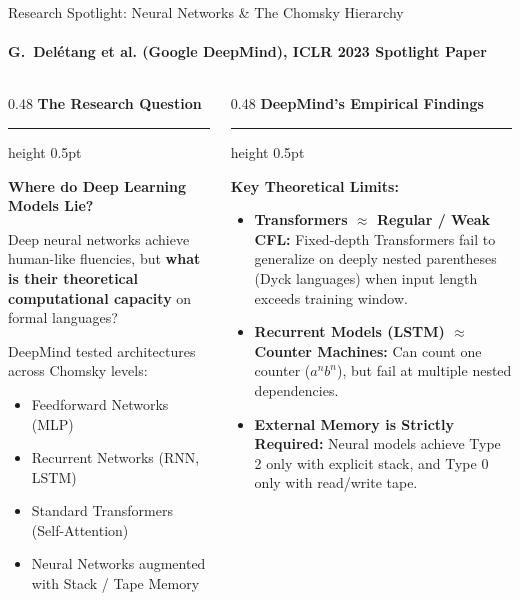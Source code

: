 \documentclass[aspectratio=169, 10pt]{beamer}
\newcommand{\colheader}[1]{%
  {\noindent\footnotesize\bfseries\color{gimpanavy}#1}%
  \vspace{0.02cm}%
  {\color{gimpanavy!30}\hrule height 0.5pt}%
  \vspace{0.05cm}%
}
\newcommand{\cardtitle}[1]{{\noindent\footnotesize\bfseries\color{gimpanavy}#1}\par\vspace{0.03cm}}
\newcommand{\alerttitle}[1]{{\noindent\footnotesize\bfseries\color{accentCrimson}#1}\par\vspace{0.03cm}}
\begin{document}
\begin{frame}{Research Spotlight: Neural Networks \& The Chomsky Hierarchy}
  \framesubtitle{G.~Delétang et al. (Google DeepMind), ICLR 2023 Spotlight Paper}
  
  \begin{columns}[T]
    \begin{column}{0.48\textwidth}
      \colheader{The Research Question}
      \begin{tcolorbox}[spotlightcard]
        \cardtitle{Where do Deep Learning Models Lie?}
        {\scriptsize
        Deep neural networks achieve human-like fluencies, but \textbf{what is their theoretical computational capacity} on formal languages?
        
        DeepMind tested architectures across Chomsky levels:
        \begin{itemize}\setlength{\itemsep}{1.5pt}\scriptsize
          \item Feedforward Networks (MLP)
          \item Recurrent Networks (RNN, LSTM)
          \item Standard Transformers (Self-Attention)
          \item Neural Networks augmented with Stack / Tape Memory
        \end{itemize}
        }
      \end{tcolorbox}
    \end{column}
    
    \begin{column}{0.48\textwidth}
      \colheader{DeepMind's Empirical Findings}
      \begin{tcolorbox}[alertcard]
        \alerttitle{Key Theoretical Limits:}
        \begin{itemize}\setlength{\itemsep}{2pt}\scriptsize
          \item \textbf{Transformers $\approx$ Regular / Weak CFL:} Fixed-depth Transformers fail to generalize on deeply nested parentheses (Dyck languages) when input length exceeds training window.
          \item \textbf{Recurrent Models (LSTM) $\approx$ Counter Machines:} Can count one counter ($a^n b^n$), but fail at multiple nested dependencies.
          \item \textbf{External Memory is Strictly Required:} Neural models achieve Type 2 only with explicit stack, and Type 0 only with read/write tape.
        \end{itemize}
      \end{tcolorbox}
    \end{column}
  \end{columns}
  

\end{frame}
\end{document}
